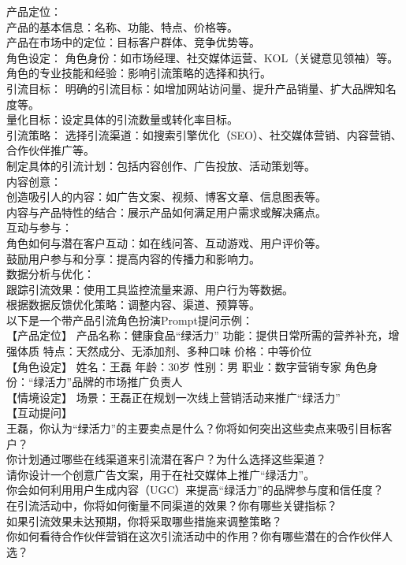 \documentclass[12pt]{book}
\begin{document}
产品定位：\\
产品的基本信息：名称、功能、特点、价格等。\\
产品在市场中的定位：目标客户群体、竞争优势等。\\
角色设定：
角色身份：如市场经理、社交媒体运营、KOL（关键意见领袖）等。\\
角色的专业技能和经验：影响引流策略的选择和执行。\\
引流目标：
明确的引流目标：如增加网站访问量、提升产品销量、扩大品牌知名度等。\\
量化目标：设定具体的引流数量或转化率目标。\\
引流策略：
选择引流渠道：如搜索引擎优化（SEO）、社交媒体营销、内容营销、合作伙伴推广等。\\
制定具体的引流计划：包括内容创作、广告投放、活动策划等。\\
内容创意：\\
创造吸引人的内容：如广告文案、视频、博客文章、信息图表等。\\
内容与产品特性的结合：展示产品如何满足用户需求或解决痛点。\\
互动与参与：\\
角色如何与潜在客户互动：如在线问答、互动游戏、用户评价等。\\
鼓励用户参与和分享：提高内容的传播力和影响力。\\
数据分析与优化：\\
跟踪引流效果：使用工具监控流量来源、用户行为等数据。\\
根据数据反馈优化策略：调整内容、渠道、预算等。\\
以下是一个带产品引流角色扮演Prompt提问示例：\\

【产品定位】 产品名称：健康食品“绿活力” 功能：提供日常所需的营养补充，增强体质 特点：天然成分、无添加剂、多种口味 价格：中等价位\\

【角色设定】 姓名：王磊 年龄：30岁 性别：男 职业：数字营销专家 角色身份：“绿活力”品牌的市场推广负责人\\

【情境设定】 场景：王磊正在规划一次线上营销活动来推广“绿活力”\\

【互动提问】\\

王磊，你认为“绿活力”的主要卖点是什么？你将如何突出这些卖点来吸引目标客户？\\
你计划通过哪些在线渠道来引流潜在客户？为什么选择这些渠道？\\
请你设计一个创意广告文案，用于在社交媒体上推广“绿活力”。\\
你会如何利用用户生成内容（UGC）来提高“绿活力”的品牌参与度和信任度？\\
在引流活动中，你将如何衡量不同渠道的效果？你有哪些关键指标？\\
如果引流效果未达预期，你将采取哪些措施来调整策略？\\
你如何看待合作伙伴营销在这次引流活动中的作用？你有哪些潜在的合作伙伴人选？\\
\end{document}
